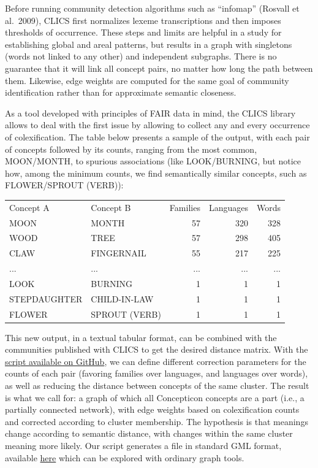 \documentclass[
  a4paper,
  14pt,
  oneside,
  tablecaptionabove
]{scrbook}
\begin{document}
Before running community detection algorithms such as \enquote{infomap}
(Rosvall et al.~2009), CLICS first normalizes lexeme transcriptions and
then imposes thresholds of occurrence. These steps and limits are
helpful in a study for establishing global and areal patterns, but
results in a graph with singletons (words not linked to any other) and
independent subgraphs. There is no guarantee that it will link all
concept pairs, no matter how long the path between them. Likewise, edge
weights are computed for the same goal of community identification
rather than for approximate semantic closeness.

As a tool developed with principles of FAIR data in mind, the CLICS
library allows to deal with the first issue by allowing to collect any
and every occurrence of colexification. The table below presents a
sample of the output, with each pair of concepts followed by its counts,
ranging from the most common, MOON/MONTH, to spurious associations (like
LOOK/BURNING, but notice how, among the minimum counts, we find
semantically similar concepts, such as FLOWER/SPROUT (VERB)):

\begin{table}[h]
\centering
\begin{tabular}{llrrr}
Concept A    & Concept B     & Families & Languages & Words \\
MOON         & MONTH         & 57       & 320       & 328   \\
WOOD         & TREE          & 57       & 298       & 405   \\
CLAW         & FINGERNAIL    & 55       & 217       & 225   \\
...          & ...           & ...      & ...       & ...   \\
LOOK         & BURNING       & 1        & 1         & 1     \\
STEPDAUGHTER & CHILD-IN-LAW  & 1        & 1         & 1     \\
FLOWER       & SPROUT (VERB) & 1        & 1         & 1    
\end{tabular}
\end{table}

This new output, in a textual tabular format, can be combined with the
communities published with CLICS to get the desired distance matrix.
With the \href{https://github.com/tresoldi/semantic_distance}{script
available on GitHub}, we can define different correction parameters for
the counts of each pair (favoring families over languages, and languages
​​over words), as well as reducing the distance between concepts of the
same cluster. The result is what we call for: a graph of which all
Concepticon concepts are a part (i.e., a partially connected network),
with edge weights based on colexification counts and corrected according
to cluster membership. The hypothesis is that meanings change according
to semantic distance, with changes within the same cluster meaning more
likely. Our script generates a file in standard GML format, available
\href{https://github.com/tresoldi/semantic_distance/blob/master/output/graph.gml}{here}
which can be explored with ordinary graph tools.
\end{document}
